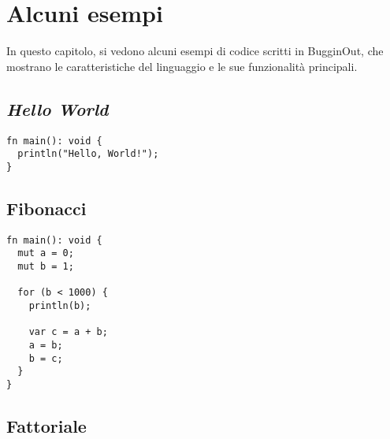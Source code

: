 
\chapter{Alcuni esempi}
\label{chap:alcuni-esempi}

In questo capitolo, si vedono alcuni esempi di codice scritti in BugginOut, che mostrano le caratteristiche del linguaggio e le sue funzionalità principali.


\section{\textit{Hello World}}
\label{sec:hello-world-example}

\hfill

\begin{mdframed}[style=examplestyle]
	\begin{verbatim}
fn main(): void {
  println("Hello, World!");
}
	\end{verbatim}
\end{mdframed}

\section{Fibonacci}
\label{sec:fibonacci-example}

\hfill

\begin{mdframed}[style=examplestyle]
	\begin{verbatim}
fn main(): void {
  mut a = 0;
  mut b = 1;

  for (b < 1000) {
    println(b);

    var c = a + b;
    a = b;
    b = c;
  }
}
	\end{verbatim}
\end{mdframed}

\section{Fattoriale}
\label{sec:factorial-example}

\hfill

